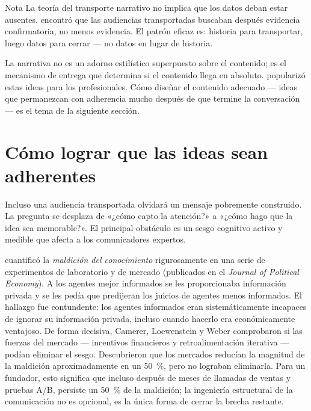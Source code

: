 \begin{admonition}{Nota}
La teoría del transporte narrativo no implica que los datos deban estar ausentes.
\textcite{green2000narrative} encontró que las audiencias transportadas buscaban después
evidencia confirmatoria, no menos evidencia. El patrón eficaz es: historia para transportar,
luego datos para cerrar — no datos en lugar de historia.
\end{admonition}

La narrativa no es un adorno estilístico superpuesto sobre el contenido; es el mecanismo de
entrega que determina si el contenido llega en absoluto. \textcite{heath2007madetostick}
popularizó estas ideas para los profesionales. Cómo diseñar el contenido adecuado — ideas que
permanezcan con adherencia mucho después de que termine la conversación — es el tema de la
siguiente sección.

\section{Cómo lograr que las ideas sean adherentes}\label{sec:made-to-stick}

Incluso una audiencia transportada olvidará un mensaje pobremente construido. La pregunta
se desplaza de «¿cómo capto la atención?» a «¿cómo hago que la idea sea memorable?». El
principal obstáculo es un sesgo cognitivo activo y medible que afecta a los comunicadores
expertos.

\textcite{camerer1989curse} cuantificó la \emph{maldición del conocimiento} rigurosamente
en una serie de experimentos de laboratorio y de mercado (publicados en el \emph{Journal of
Political Economy}). %
A los agentes mejor informados se les proporcionaba información privada y se les pedía que
predijeran los juicios de agentes menos informados. El hallazgo fue contundente: los agentes
informados eran sistemáticamente incapaces de ignorar su información privada, incluso cuando
hacerlo era económicamente ventajoso. De forma decisiva, Camerer, Loewenstein y Weber
comprobaron si las fuerzas del mercado — incentivos financieros y retroalimentación iterativa
— podían eliminar el sesgo. Descubrieron que los mercados reducían la magnitud de la maldición
aproximadamente en un \qty{50}{\percent}, pero no lograban eliminarla. %
Para un fundador, esto significa que incluso después de meses de llamadas de ventas y pruebas
A/B, persiste un \qty{50}{\percent} de la maldición; la ingeniería estructural de la
comunicación no es opcional, es la única forma de cerrar la brecha restante.

